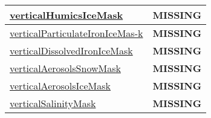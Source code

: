 {\begin{center}
\begin{longtable}{| p{2.0in} | p{4.0in} |}
    \hline
    \hyperref[subsec:var_sec_tracer_masks_verticalHumicsIceMask]{verticalHumicsIceMask} & {\bf \color{red} MISSING} \\
    \hline
    \hyperref[subsec:var_sec_tracer_masks_verticalParticulateIronIceMask]{verticalParticulateIronIceMas-}\hyperref[subsec:var_sec_tracer_masks_verticalParticulateIronIceMask]{k  }& {\bf \color{red} MISSING} \\
    \hline
    \hyperref[subsec:var_sec_tracer_masks_verticalDissolvedIronIceMask]{verticalDissolvedIronIceMask} & {\bf \color{red} MISSING} \\
    \hline
    \hyperref[subsec:var_sec_tracer_masks_verticalAerosolsSnowMask]{verticalAerosolsSnowMask} & {\bf \color{red} MISSING} \\
    \hline
    \hyperref[subsec:var_sec_tracer_masks_verticalAerosolsIceMask]{verticalAerosolsIceMask} & {\bf \color{red} MISSING} \\
    \hline
    \hyperref[subsec:var_sec_tracer_masks_verticalSalinityMask]{verticalSalinityMask} & {\bf \color{red} MISSING} \\
    \hline
\end{longtable}
\end{center}
}
